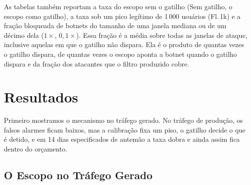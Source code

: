 \documentclass[conference,letterpaper,10pt]{IEEEtran}
\newcommand\1{\textit{(i)}}
\newcommand\2{\textit{(ii)}}
\newcommand\3{\textit{(iii)}}
\begin{document}
As tabelas também reportam a taxa do escopo sem o gatilho (Sem gatilho, o escopo como gatilho), a taxa sob um pico legítimo de 1\,000 usuários (Fl.\,1k) e a fração bloqueada de botnets do tamanho de uma janela mediana ou de um décimo dela ($1\times$, $0{,}1\times$). Essa fração é a média sobre todas as janelas de ataque, inclusive aquelas em que o gatilho não dispara. Ela é o produto de quantas vezes o gatilho dispara, de quantas vezes o escopo aponta a botnet quando o gatilho dispara e da fração dos atacantes que o filtro produzido cobre.

\section{Resultados}
\label{sec:results}

Primeiro mostramos o mecanismo no tráfego gerado. No tráfego de produção, os falsos alarmes ficam baixos, mas a calibração fixa um piso, o gatilho decide o que é detido, e em 14 dias especificados de antemão a taxa dobra e ainda assim fica dentro do orçamento.

\subsection{O Escopo no Tráfego Gerado}
\label{sec:symbolic-detector}
\label{sec:collateral}
\label{sec:ablation}
\end{document}
